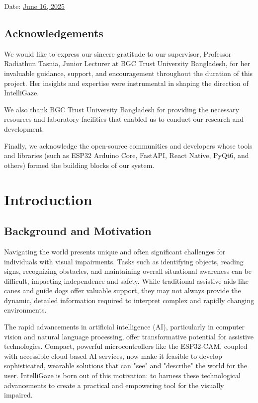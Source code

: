 \documentclass[12pt, a4paper]{report}
\begin{document}
Date: \underline{June 16, 2025 \hspace{0.2cm}}
\newpage

\section*{Acknowledgements}
We would like to express our sincere gratitude to our supervisor, Professor Radiathun Tasnia, Junior Lecturer at BGC Trust University Bangladesh, for her invaluable guidance, support, and encouragement throughout the duration of this project. Her insights and expertise were instrumental in shaping the direction of IntelliGaze.

We also thank BGC Trust University Bangladesh for providing the necessary resources and laboratory facilities that enabled us to conduct our research and development.

Finally, we acknowledge the open-source communities and developers whose tools and libraries (such as ESP32 Arduino Core, FastAPI, React Native, PyQt6, and others) formed the building blocks of our system.
\newpage

\tableofcontents
\newpage
\listoffigures
\newpage

\chapter{Introduction}
\section{Background and Motivation}
Navigating the world presents unique and often significant challenges for individuals with visual impairments. Tasks such as identifying objects, reading signs, recognizing obstacles, and maintaining overall situational awareness can be difficult, impacting independence and safety. While traditional assistive aids like canes and guide dogs offer valuable support, they may not always provide the dynamic, detailed information required to interpret complex and rapidly changing environments.

The rapid advancements in artificial intelligence (AI), particularly in computer vision and natural language processing, offer transformative potential for assistive technologies. Compact, powerful microcontrollers like the ESP32-CAM, coupled with accessible cloud-based AI services, now make it feasible to develop sophisticated, wearable solutions that can "see" and "describe" the world for the user. IntelliGaze is born out of this motivation: to harness these technological advancements to create a practical and empowering tool for the visually impaired.
\end{document}
